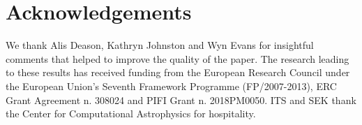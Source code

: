 \documentclass[a4paper,useAMS,usenatbib]{mnras}
\begin{document}
\section*{Acknowledgements}

We thank Alis Deason, Kathryn Johnston and Wyn Evans for insightful
comments that helped to improve the quality of the paper.  The
research leading to these results has received funding from the
European Research Council under the European Union's Seventh Framework
Programme (FP/2007-2013), ERC Grant Agreement n. 308024 and PIFI Grant
n. 2018PM0050. ITS and SEK thank the Center for Computational
Astrophysics for hospitality.





\label{lastpage}
\end{document}
